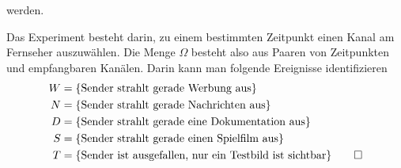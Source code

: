 \begin{loesung}
\begin{teilaufgaben}
werden.
\item 
Das Experiment besteht darin, zu einem bestimmten Zeitpunkt
einen Kanal am Fernseher auszuwählen.
Die Menge $\Omega$ besteht also aus Paaren von Zeitpunkten und
empfangbaren Kanälen.
Darin kann man folgende Ereignisse identifizieren
\begin{align*}
W&=\{\text{Sender strahlt gerade Werbung aus}\}\\
N&=\{\text{Sender strahlt gerade Nachrichten aus}\}\\
D&=\{\text{Sender strahlt gerade eine Dokumentation aus}\}\\
S&=\{\text{Sender strahlt gerade einen Spielfilm aus}\}\\
T&=\{\text{Sender ist ausgefallen, nur ein Testbild ist sichtbar}\}
\qedhere
\end{align*}
\end{teilaufgaben}
\end{loesung}


